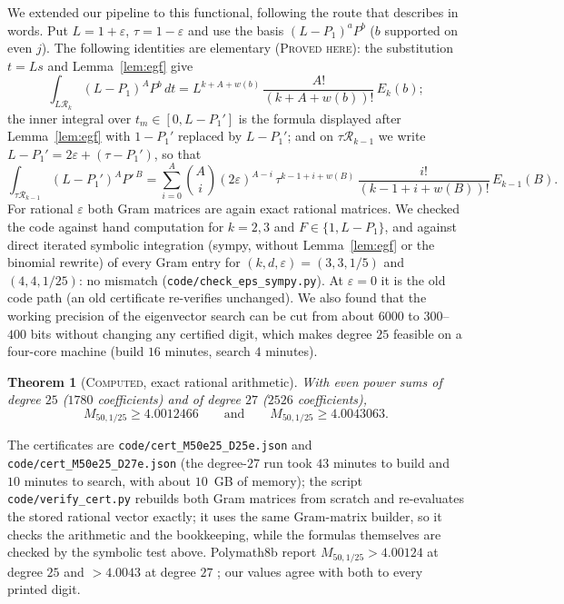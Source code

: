 \documentclass[11pt]{amsart}
\newtheorem{theorem}{Theorem}
\theoremstyle{definition}
\theoremstyle{remark}
\newcommand{\lbl}[1]{\textup{\textsc{#1}}}
\newcommand{\R}{\mathcal{R}}
\begin{document}
We extended our pipeline to this functional, following the route that
\cite[\S7.2]{Pol14b} describes in words. Put $L=1+\varepsilon$,
$\tau=1-\varepsilon$ and use the basis $(L-P_1)^aP^b$ ($b$ supported on even
$j$). The following identities are elementary (\lbl{Proved here}): the
substitution $t=Ls$ and Lemma~\ref{lem:egf} give
\[
\int_{L\R_k}(L-P_1)^AP^b\,dt=L^{k+A+w(b)}\,\frac{A!}{(k+A+w(b))!}\,E_k(b);
\]
the inner integral over $t_m\in[0,L-P_1']$ is the formula displayed after
Lemma~\ref{lem:egf} with $1-P_1'$ replaced by $L-P_1'$; and on
$\tau\R_{k-1}$ we write $L-P_1'=2\varepsilon+(\tau-P_1')$, so that
\[
\int_{\tau\R_{k-1}}(L-P_1')^AP'^{\,B}=\sum_{i=0}^{A}\binom Ai(2\varepsilon)^{A-i}\,
\tau^{k-1+i+w(B)}\,\frac{i!}{(k-1+i+w(B))!}\,E_{k-1}(B).
\]
For rational $\varepsilon$ both Gram matrices are again exact rational
matrices. We checked the code against hand computation for $k=2,3$ and
$F\in\{1,L-P_1\}$, and against direct iterated symbolic integration (sympy,
without Lemma~\ref{lem:egf} or the binomial rewrite) of every Gram entry for
$(k,d,\varepsilon)=(3,3,1/5)$ and $(4,4,1/25)$: no mismatch
(\texttt{code/check\_eps\_sympy.py}). At $\varepsilon=0$ it is the old code
path (an old certificate re-verifies unchanged). We also found that the working precision of
the eigenvector search can be cut from about $6000$ to $300$--$400$ bits
without changing any certified digit, which makes degree $25$ feasible on a
four-core machine (build $16$ minutes, search $4$ minutes).

\begin{theorem}[\lbl{Computed}, exact rational arithmetic]\label{thm:Meps}
With even power sums of degree $25$ ($1780$ coefficients) and of degree $27$
($2526$ coefficients),
\[
M_{50,1/25}\ge4.0012466\qquad\text{and}\qquad M_{50,1/25}\ge4.0043063 .
\]
\end{theorem}

The certificates are \texttt{code/cert\_M50e25\_D25e.json} and
\texttt{code/cert\_M50e25\_D27e.json} (the degree-$27$ run took $43$ minutes
to build and $10$ minutes to search, with about $10$~GB of memory); the script
\texttt{code/verify\_cert.py} rebuilds both Gram matrices from scratch and
re-evaluates the stored rational vector exactly; it uses the same
Gram-matrix builder, so it checks the arithmetic and the bookkeeping, while
the formulas themselves are checked by the symbolic test above. Polymath8b report
$M_{50,1/25}>4.00124$ at degree $25$ and $>4.0043$ at degree $27$
\cite[\S7.2]{Pol14b}; our values agree with both to every printed digit.
\end{document}
